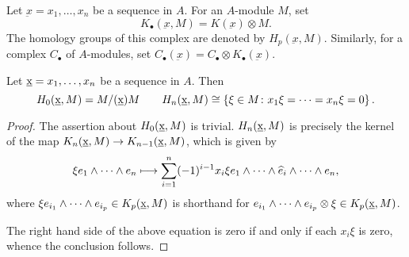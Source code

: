 \begin{definition}
    Let $\underbar{x} = x_1,\dots,x_n$ be a sequence in $A$. For an $A$-module $M$, set 
    \begin{equation*}
    K_\bullet(\underbar x, M) = K(\underbar x)\otimes M.
    \end{equation*}
    The homology groups of this complex are denoted by $H_p(\underbar{x}, M)$.
    Similarly, for a complex $C_\bullet$ of $A$-modules, set $C_\bullet(\underbar x) = C_\bullet\otimes K_\bullet(\underbar x)$.
\end{definition}

\begin{proposition}
    Let $\underbar{x} = x_1,\dots,x_n$ be a sequence in $A$. Then 
    \begin{equation*}
        H_0(\underbar{x}, M) = M/(\underbar{x})M\qquad H_n(\underbar{x}, M)\cong\left\{\xi\in M\colon x_1\xi = \cdots = x_n\xi = 0\right\}.
    \end{equation*}
\end{proposition}
\begin{proof}
    The assertion about $H_0(\underbar{x}, M)$ is trivial. $H_n(\underbar{x}, M)$ is precisely the kernel of the map $K_n(\underbar{x}, M)\to K_{n - 1}(\underbar{x}, M)$, which is given by 
    \begin{equation*}
        \xi e_1\wedge\dots\wedge e_n\longmapsto\sum_{i = 1}^n (-1)^{i - 1}x_i\xi e_1\wedge\dots\wedge\widehat{e}_i\wedge\dots\wedge e_n,
    \end{equation*}
    where $\xi e_{i_1}\wedge\dots\wedge e_{i_p}\in K_p(\underbar{x}, M)$ is shorthand for $e_{i_1}\wedge\dots\wedge e_{i_p}\otimes\xi\in K_p(\underbar{x}, M)$.

    The right hand side of the above equation is zero if and only if each $x_i\xi$ is zero, whence the conclusion follows.
\end{proof}

